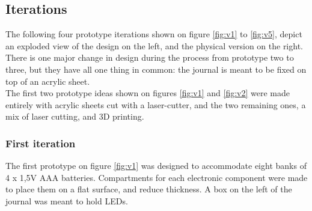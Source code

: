 \subsection{Iterations}

The following four prototype iterations shown on figure \ref{fig:v1} to \ref{fig:v5}, depict an exploded view of the design on the left, and the physical version on the right. There is one major change in design during the process from prototype two to three, but they have all one thing in common: the journal is meant to be fixed on top of an acrylic sheet. \\
The first two prototype ideas shown on figures \ref{fig:v1} and \ref{fig:v2} were made entirely with acrylic sheets cut with a laser-cutter, and the two remaining ones, a mix of laser cutting, and 3D printing.

\subsubsection{First iteration}
The first prototype on figure \ref{fig:v1} was designed to accommodate eight banks of 4 x 1,5V AAA batteries. Compartments for each electronic component were made to place them on a flat surface, and reduce thickness. A box on the left of the journal was meant to hold LEDs. 

